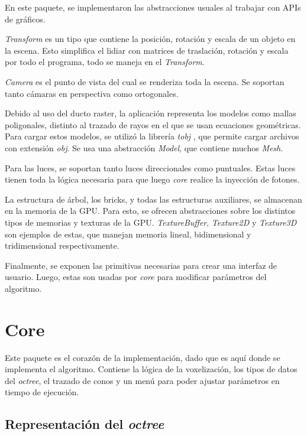 En este paquete, se implementaron las abstracciones usuales al trabajar con APIs de gráficos.

\textit{Transform} es un tipo que contiene la posición, rotación y escala de un objeto en la escena.
Esto simplifica el lidiar con matrices de traslación, rotación y escala por todo el programa, todo se maneja en el \textit{Transform}.

\textit{Camera} es el punto de vista del cual se renderiza toda la escena.
Se soportan tanto cámaras en perspectiva como ortogonales.

Debido al uso del ducto raster, la aplicación representa los modelos como mallas poligonales, distinto al trazado de rayos en el que se usan ecuaciones geométricas.
Para cargar estos modelos, se utilizó la librería \textit{tobj} \cite{tobj-crate}, que permite cargar archivos con extensión \textit{obj}.
Se usa una abstracción \textit{Model}, que contiene muchos \textit{Mesh}.

Para las luces, se soportan tanto luces direccionales como puntuales.
Estas luces tienen toda la lógica necesaria para que luego \textit{core} realice la inyección de fotones.

La estructura de árbol, los bricks, y todas las estructuras auxiliares, se almacenan en la memoria de la GPU.
Para esto, se ofrecen abstracciones sobre los distintos tipos de memorias y texturas de la GPU.
\textit{TextureBuffer}, \textit{Texture2D} y \textit{Texture3D} son ejemplos de estas, que manejan memoria lineal, bidimensional y tridimensional respectivamente.

Finalmente, se exponen las primitivas necesarias para crear una interfaz de usuario.
Luego, estas son usadas por \textit{core} para modificar parámetros del algoritmo.

\section{Core}

Este paquete es el corazón de la implementación, dado que es aquí donde se implementa el algoritmo.
Contiene la lógica de la voxelización, los tipos de datos del \textit{octree}, el trazado de conos y un menú para poder ajustar parámetros en tiempo de ejecución.

\subsection{Representación del \textit{octree}}

